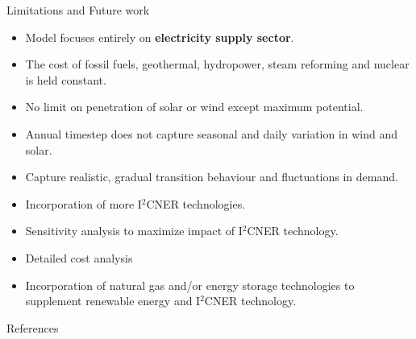\documentclass[final]{beamer}
\newlength{\onecolwid}
\newlength{\threecolwid}
\begin{document}
\begin{frame}[t]
\begin{columns}[t,totalwidth=\threecolwid]
\begin{column}{\onecolwid}
\begin{block}{Limitations and Future work}
    \begin{itemize}
    
    \item Model focuses entirely on \textbf{electricity supply sector}.
    
    \item The cost of fossil fuels, geothermal, hydropower, steam reforming and nuclear is held constant.
    
    \item No limit on penetration of solar or wind except maximum potential.
    
    \item Annual timestep does not capture seasonal and daily variation in wind and solar.    
    
    \item Capture realistic, gradual transition behaviour and fluctuations in demand.
    
    \item Incorporation of more I$^2$CNER technologies.
    
    \item Sensitivity analysis to maximize impact of I$^2$CNER technology.
    
    \item Detailed cost analysis
    
    \item Incorporation of natural gas and/or energy storage technologies to supplement renewable energy and I$^2$CNER technology. 
    
    \end{itemize}
\end{block}

\begin{block}{References}
        {\footnotesize 
        }
\end{block}




\end{column}
\end{columns}
\end{frame}
\end{document}
